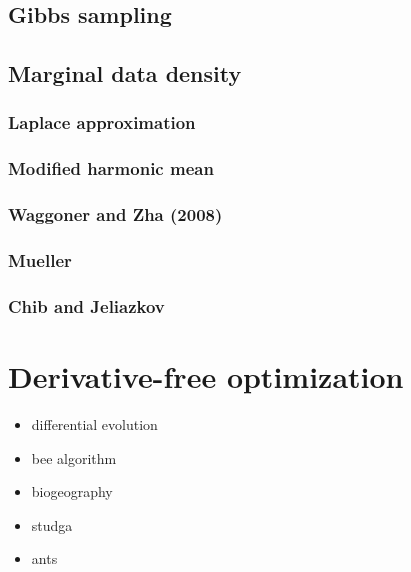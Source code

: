 \documentclass[letterpaper,10pt,english]{sphinxmanual}
\begin{document}
\section{Gibbs sampling}
\label{mcmc:gibbs-sampling}

\section{Marginal data density}
\label{mcmc:marginal-data-density}

\subsection{Laplace approximation}
\label{mcmc:laplace-approximation}

\subsection{Modified harmonic mean}
\label{mcmc:modified-harmonic-mean}

\subsection{Waggoner and Zha (2008)}
\label{mcmc:waggoner-and-zha-2008}

\subsection{Mueller}
\label{mcmc:mueller}

\subsection{Chib and Jeliazkov}
\label{mcmc:chib-and-jeliazkov}

\chapter{Derivative-free optimization}
\label{derivative_free_optimization:derivative-free-optimization}\label{derivative_free_optimization::doc}\begin{itemize}
\item {} 
differential evolution

\item {} 
bee algorithm

\item {} 
biogeography

\item {} 
studga

\item {} 
ants

\end{itemize}
\end{document}
